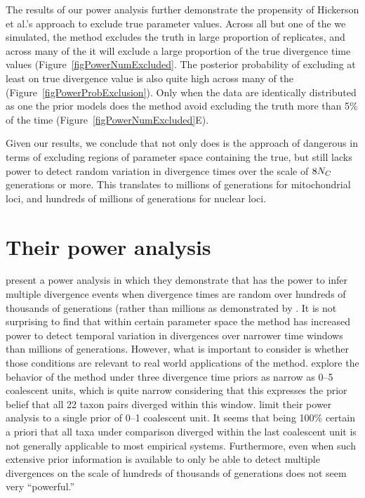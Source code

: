 \documentclass[letterpaper,12pt]{article}
\begin{document}
\begin{linenumbers}
The results of our power analysis further demonstrate the
propensity of Hickerson et al.'s \citeyear{Hickerson2013} approach
to exclude true parameter values.
Across all but one of the  we simulated, the method excludes the
truth in large proportion of replicates, and across many of the  it
will exclude a large proportion of the true divergence time values
(Figure~\ref{figPowerNumExcluded}.
The posterior probability of excluding at least on true divergence value is
also quite high across many of the 
(Figure~\ref{figPowerProbExclusion}).
Only when the data are identically distributed as one the prior models does
the method avoid excluding the truth more than 5\% of the time
(Figure~\ref{figPowerNumExcluded}E).

Given our results, we conclude that not only does is the approach of
\citet{Hickerson2013} dangerous in terms of excluding regions of parameter
space containing the true, but still lacks power to detect random variation in
divergence times over the scale of $8N_C$ generations or more.
This translates to millions of generations for mitochondrial loci, and hundreds
of millions of generations for nuclear loci.



\section*{Their power analysis}
\citet{Hickerson2013} present a power analysis in which they demonstrate that
\msb has the power to infer multiple divergence events when divergence times
are random over hundreds of thousands of generations (rather than millions
as demonstrated by \citet{Oaks2012}.
It is not surprising to find that within certain parameter space the method
has increased power to detect temporal variation in divergences over narrower
time windows than millions of generations.
However, what is important to consider is whether those conditions are relevant
to real world applications of the method.
\citet{Oaks2012} explore the behavior of the method under three divergence time
priors as narrow as 0--5 coalescent units, which is quite narrow considering
that this expresses the prior belief that all 22 taxon pairs diverged within
this window.
\citet{Hickerson2013} limit their power analysis to a single prior of 0--1
coalescent unit.
It seems that being 100\% certain a priori that all taxa under comparison
diverged within the last coalescent unit is not generally applicable to most
empirical systems.
Furthermore, even when such extensive prior information is available to only be
able to detect multiple divergences on the scale of hundreds of thousands of
generations does not seem very ``powerful.''


\end{linenumbers}
\end{document}
